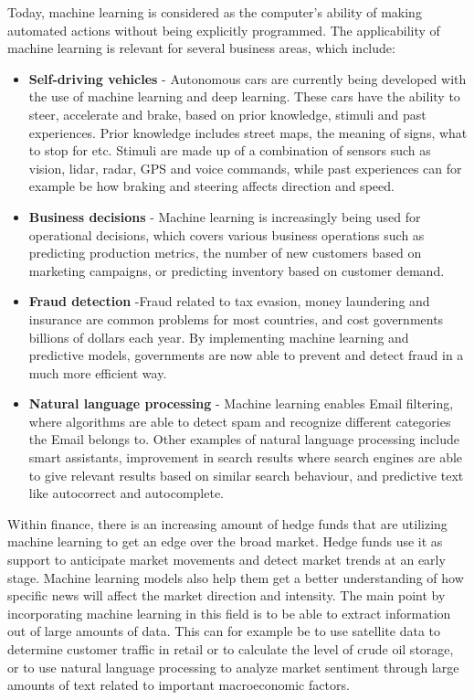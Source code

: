 \indent\newline
Today, machine learning is considered as the computer's ability of making automated actions without being explicitly programmed. The applicability of machine learning is relevant for several business areas, which include:
\indent \newline
\begin{itemize}
\item {\textbf{Self-driving vehicles} - Autonomous cars are currently being developed with the use of machine learning and deep learning. These cars have the ability to steer, accelerate and brake, based on prior knowledge, stimuli and past experiences. Prior knowledge includes street maps, the meaning of signs, what to stop for etc. Stimuli are made up of a combination of sensors such as vision, lidar, radar, GPS and voice commands, while past experiences can for example be how braking and steering affects direction and speed.}
\item {\textbf{Business decisions} - Machine learning is increasingly being used for operational decisions, which covers various business operations such as predicting production metrics, the number of new customers based on marketing campaigns, or predicting inventory based on customer demand.}
\item {\textbf{Fraud detection} -Fraud related to tax evasion, money laundering and insurance are common problems for most countries, and cost governments billions of dollars each year. By implementing machine learning and predictive models, governments are now able to prevent and detect fraud in a much more efficient way.}
\item {\textbf{Natural language processing} - Machine learning enables Email filtering, where algorithms are able to detect spam and recognize different categories the Email belongs to. Other examples of natural language processing include smart assistants, improvement in search results where search engines are able to give relevant results based on similar search behaviour, and predictive text like autocorrect and autocomplete.}
\end{itemize}

\indent\newline
Within finance, there is an increasing amount of hedge funds that are utilizing machine learning to get an edge over the broad market. Hedge funds use it as support to anticipate market movements and detect market trends at an early stage. Machine learning models also help them get a better understanding of how specific news will affect the market direction and intensity. The main point by incorporating machine learning in this field is to be able to extract information out of large amounts of data. This can for example be to use satellite data to determine customer traffic in retail or to calculate the level of crude oil storage, or to use natural language processing to analyze market sentiment through large amounts of text related to important macroeconomic factors.    

